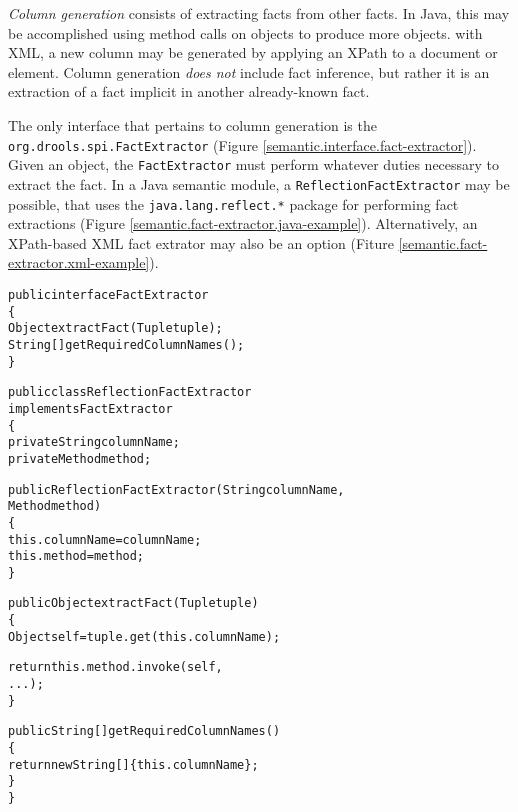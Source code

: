 \documentclass[10pt,twocolumn,letterpaper]{article}
\newenvironment{codelisting}%
	{\begin{minipage}{250pt}\small\begin{alltt}}%
	{\end{alltt}\end{minipage}}
\begin{document}
\emph{Column generation} consists of extracting facts from other
facts.  In Java, this may be accomplished using method calls on
objects to produce more objects.  with XML, a new column may be
generated by applying an XPath to a document or element.  Column
generation \emph{does not} include fact inference, but rather
it is an extraction of a fact implicit in another already-known
fact.

The only interface that pertains to column generation is the
\verb|org.drools.spi.FactExtractor| (Figure
\ref{semantic.interface.fact-extractor}).
Given an object, the \verb|FactExtractor| must perform whatever 
duties necessary to extract the fact. In a Java semantic module, a 
\verb|ReflectionFactExtractor| may be possible, that uses the
\verb|java.lang.reflect.*| package for performing fact 
extractions (Figure \ref{semantic.fact-extractor.java-example}).
Alternatively, an XPath-based XML fact extrator may also
be an option (Fiture \ref{semantic.fact-extractor.xml-example}).

\begin{figure*}[p]
	\begin{codelisting}
	public interface FactExtractor
	\{
	     Object extractFact(Tuple tuple);
	     String[] getRequiredColumnNames();
	\}
	\end{codelisting}
	\caption{The \emph{FactExtractor} interface.}
	\label{semantic.interface.fact-extractor}
\end{figure*}

\begin{figure*}[p]
	\begin{codelisting}
	public class ReflectionFactExtractor 
	             implements FactExtractor
	\{
	     private String columnName;
	     private Method method;

	     public ReflectionFactExtractor(String columnName,
	                                    Method method)
	     \{
	          this.columnName = columnName;
	          this.method     = method;
	     \}

	     public Object extractFact(Tuple tuple)
	     \{
	          Object self = tuple.get( this.columnName );

	          return this.method.invoke( self,
	                                     ... );
	     \}

	     public String[] getRequiredColumnNames()
	     \{
	          return new String[] \{ this.columnName \};
	     \}
	\}
	\end{codelisting}
	\caption{Example \emph{FactExtractor} implementing Java method semantics.}
	\label{semantic.fact-extractor.java-example}
\end{figure*}
\end{document}
